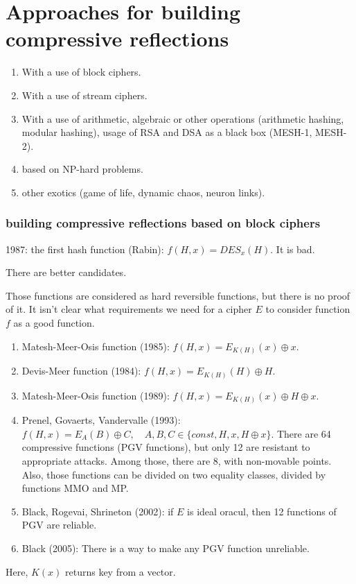 \section{Approaches for building compressive reflections}
\begin{enumerate}[noitemsep]
    \item With a use of block ciphers.
    \item With a use of stream ciphers.
    \item With a use of arithmetic, algebraic or other operations (arithmetic hashing,
        modular hashing), usage of RSA and DSA as a black box (MESH-1, MESH-2).
    \item based on NP-hard problems.
    \item other exotics (game of life, dynamic chaos, neuron links).
\end{enumerate}

\subsubsection*{building compressive reflections based on block ciphers}

1987: the first hash function (Rabin): $f(H, x) = DES_x(H)$. It is bad.

There are better candidates.
\begin{remark}
    Those functions are considered as hard reversible functions, but there is no
    proof of it. It isn't clear what requirements we need for a cipher $E$ to
    consider function $f$ as a good function.
\end{remark}

\begin{enumerate}[noitemsep]
    \item Matesh-Meer-Osis function (1985): $f(H, x) = E_{K(H)}(x) \oplus x$.
    \item Devis-Meer function (1984): $f(H, x) = E_{K(H)}(H) \oplus H$.
    \item Matesh-Meer-Osis function (1989): $f(H, x) = E_{K(H)}(x) \oplus H \oplus x$.
    \item Prenel, Govaerts, Vandervalle (1993):
        $f(H, x) = E_A(B) \oplus C, \quad A, B, C \in \{const, H, x, H \oplus x\}$.
        There are 64 compressive functions (PGV functions), but only 12 are resistant
        to appropriate attacks. Among those, there are 8, with non-movable points.
        Also, those functions can be divided on two equality classes, divided by
        functions MMO and MP.
    \item Black, Rogevai, Shrineton (2002): if $E$ is ideal oracul, then 12 functions
        of PGV are reliable.
    \item Black (2005): There is a way to make any PGV function unreliable.
\end{enumerate}
Here, $K(x)$ returns key from a vector.

